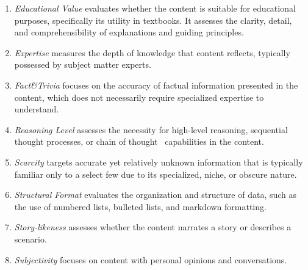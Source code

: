 \documentclass[11pt]{article}
\begin{document}
\begin{enumerate}
\item \textit{Educational Value} evaluates whether the content is suitable for educational purposes, specifically its utility in textbooks. It assesses the clarity, detail, and comprehensibility of explanations and guiding principles. %

\item \textit{Expertise} measures the depth of knowledge that content reflects, typically possessed by subject matter experts. 

\item \textit{Fact\&Trivia} focuses on the accuracy of factual information presented in the content, which does not necessarily require specialized expertise to understand. 

\item \textit{Reasoning Level} assesses the necessity for high-level reasoning, sequential thought processes, or chain of thought~\citep{wei2022chain} capabilities in the content. 

\item \textit{Scarcity} targets accurate yet relatively unknown information that is typically familiar only to a select few due to its specialized, niche, or obscure nature.

\item \textit{Structural Format} evaluates the organization and structure of data, such as the use of numbered lists, bulleted lists, and markdown formatting.

\item \textit{Story-likeness} assesses whether the content narrates a story or describes a scenario.

\item \textit{Subjectivity} focuses on content with personal opinions and conversations.


\end{enumerate}
\end{document}
